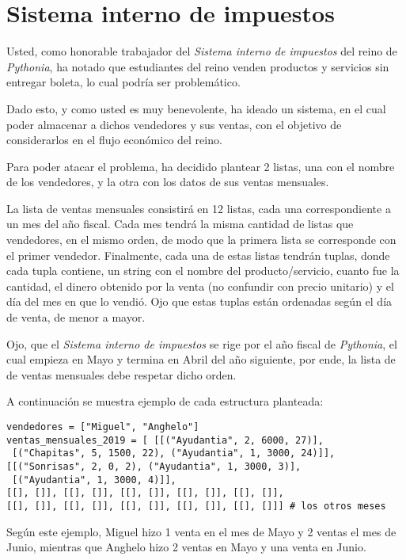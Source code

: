 \section{Sistema interno de impuestos}

Usted, como honorable trabajador del \textit{Sistema interno de impuestos} del reino de \textit{Pythonia}, ha notado que estudiantes del reino venden productos y servicios sin entregar boleta, lo cual podría ser problemático.

Dado esto, y como usted es muy benevolente, ha ideado un sistema, en el cual poder almacenar a dichos vendedores y sus ventas, con el objetivo de considerarlos en el flujo económico del reino.

Para poder atacar el problema, ha decidido plantear 2 listas, una con el nombre de los vendedores, y la otra con los datos de sus ventas mensuales. 

La lista de ventas mensuales consistirá en 12 listas, cada una correspondiente a un mes del año fiscal. Cada mes tendrá la misma cantidad de listas que vendedores, en el mismo orden, de modo que la primera lista se corresponde con el primer vendedor. Finalmente, cada una de estas listas tendrán tuplas, donde cada tupla contiene, un string con el nombre del producto/servicio, cuanto fue la cantidad, el dinero obtenido por la venta (no confundir con precio unitario) y el día del mes en que lo vendió. Ojo que estas tuplas están ordenadas según el día de venta, de menor a mayor.

Ojo, que el \textit{Sistema interno de impuestos} se rige por el año fiscal de \textit{Pythonia}, el cual empieza en Mayo y termina en Abril del año siguiente, por ende, la lista de de ventas mensuales debe respetar dicho orden.

A continuación se muestra ejemplo de cada estructura planteada:

\begin{lstlisting}[style=consola]
vendedores = ["Miguel", "Anghelo"]
ventas_mensuales_2019 = [ [[("Ayudantia", 2, 6000, 27)],
 [("Chapitas", 5, 1500, 22), ("Ayudantia", 1, 3000, 24)]],
[[("Sonrisas", 2, 0, 2), ("Ayudantia", 1, 3000, 3)],  
 [("Ayudantia", 1, 3000, 4)]],
[[], []], [[], []], [[], []], [[], []], [[], []],
[[], []], [[], []], [[], []], [[], []], [[], []]] # los otros meses
\end{lstlisting}

Según este ejemplo, Miguel hizo 1 venta en el mes de Mayo y 2 ventas el mes de Junio, mientras que Anghelo hizo 2 ventas en Mayo y una venta en Junio.

